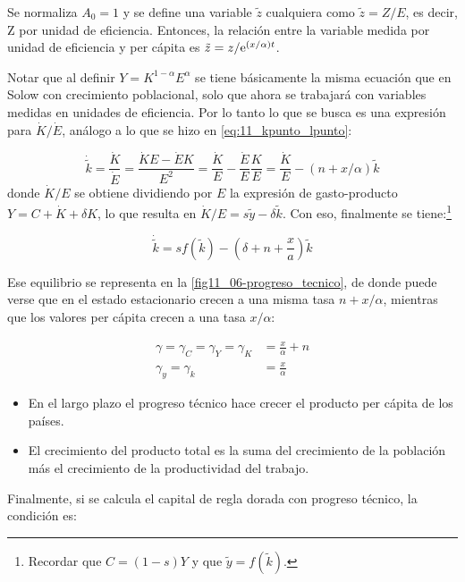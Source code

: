 \documentclass[DeGregorioResumen]{subfiles}
\begin{document}
Se normaliza $A_0=1$ y se define una variable $\tilde z$ cualquiera como $\tilde z=Z/E$, es decir, Z por unidad de eficiencia. Entonces, la relación entre la variable medida por unidad de eficiencia y per cápita es $\tilde z = z/\mathrm{e}^{(x/\alpha)t}$.

Notar que al definir $Y=K^{1-\alpha}E^\alpha$ se tiene básicamente la misma ecuación que en Solow con crecimiento poblacional, solo que ahora se trabajará con variables medidas en unidades de eficiencia. Por lo tanto lo que se busca es una expresión para $\dot K / \dot E$, análogo a lo que se hizo en \eqref{eq:11_kpunto_lpunto}:

\begin{equation*}
\dot{\tilde k} = \frac{\dot K}{\dot E} = \frac{\dot K E-\dot EK}{E^2} = \frac{\dot K}{E}-\frac{\dot E}{E}\frac{K}{E} = \frac{\dot K}{E}-(n+x/\alpha)\tilde k
\end{equation*}
donde $\dot K / E$ se obtiene dividiendo por $E$ la expresión de gasto-producto $Y=C+\dot K +\delta K$, lo que resulta en $\dot K / E=s\tilde y -\delta \tilde k$. Con eso, finalmente se tiene:\footnote{Recordar que $C=(1-s)Y$ y que $\tilde y = f(\tilde k)$.}

\begin{equation}
\dot{\tilde k} = sf(\tilde k)-\left(\delta + n + \frac{x}{a}\right)\tilde k
\end{equation}



Ese equilibrio se representa en la \autoref{fig11_06-progreso_tecnico}, de donde puede verse que en el estado estacionario crecen a una misma tasa $n+x/\alpha$, mientras que los valores per cápita crecen a una tasa $x/\alpha$:

\begin{align*}
\gamma = \gamma_C = \gamma_Y = \gamma_K &= \frac{x}{\alpha} + n\\
\gamma_y =\gamma_k &=\frac{x}{\alpha}
\end{align*}

\begin{itemize}
\item En el largo plazo el progreso técnico hace crecer el producto per cápita de los países.
\item El crecimiento del producto total es la suma del crecimiento de la población más el crecimiento de la productividad del trabajo.
\end{itemize}


Finalmente, si se calcula el capital de regla dorada con progreso técnico, la condición es:
\end{document}
